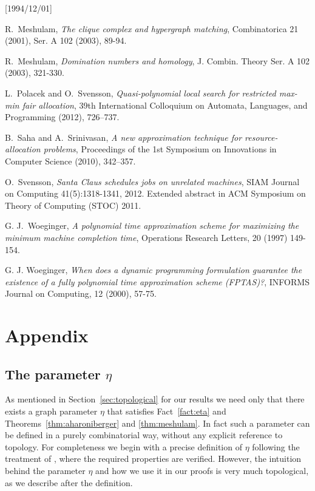 \NeedsTeXFormat{LaTeX2e}[1994/12/01]\documentclass[letterpaper, 11pt]{article}
\theoremstyle{definition}
\theoremstyle{remark}
\numberwithin{equation}{section}
\begin{document}
\begin{thebibliography}{10}
R.~Meshulam, \emph{The clique complex and hypergraph matching},
Combinatorica 21 (2001), 
Ser. A 102 (2003), 89-94.

R.~Meshulam, \emph{Domination numbers and homology}, J. Combin. Theory Ser. A 102 (2003), 321-330.

L.~Polacek and O.~Svensson, \emph{Quasi-polynomial local search for
  restricted max-min fair 
allocation}, 39th International Colloquium on Automata, Languages, and
Programming (2012), 726–737.

B.~Saha and A.~Srinivasan, \emph{A new approximation technique for
  resource-allocation problems}, 
Proceedings of the 1st Symposium on Innovations in Computer Science
(2010), 342–357.

O.~Svensson, \emph{Santa Claus schedules jobs on unrelated machines}, 
SIAM Journal on Computing 41(5):1318-1341, 2012. 
Extended abstract in ACM Symposium on Theory of Computing (STOC)
2011.

 G. J.~Woeginger, \emph{A polynomial time approximation scheme for
   maximizing the minimum machine completion time}, Operations
 Research Letters, 20 (1997) 149-154.

 G. J. Woeginger, \emph{When does a dynamic programming formulation
 guarantee the existence of a fully polynomial time approximation
 scheme (FPTAS)?}, INFORMS Journal on Computing, 12 (2000), 57-75.

\end{thebibliography}

\section{Appendix}
\subsection{The parameter $\eta$}
As mentioned in Section~\ref{sec:topological} for our results we need only that there
exists a graph parameter $\eta$ that satisfies Fact~\ref{fact:eta} and
Theorems~\ref{thm:aharoniberger} and \ref{thm:meshulam}. In fact such
a parameter can be defined in a purely combinatorial way, without any
explicit reference to topology. For completeness we begin with a
precise definition of $\eta$ following the
treatment of \cite{haxell2}, where the required properties are
verified. 
However, the intuition behind the parameter $\eta$ and how we use it
in our proofs is very much topological, as we describe after the definition. 
\end{document}

